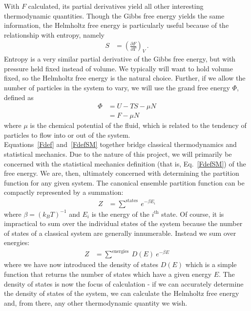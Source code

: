 \documentclass[12pt]{article}
\begin{document}
With $F$ calculated, its partial derivatives yield all other interesting thermodynamic quantities. Though the Gibbs free energy yields the same information, the Helmholtz free energy is particularly useful because of the relationship with entropy, namely
\begin{align}
    S &= \left(\frac{\partial F}{\partial T}\right)_{V}\, .
\end{align}
Entropy is a very similar partial derivative of the Gibbs free energy, but with pressure held fixed instead of volume. We typically will want to hold volume fixed, so the Helmholtz free energy is the natural choice. Further, if we allow the number of particles in the system to vary, we will use the grand free energy $\Phi$, defined as
\begin{align}
    \Phi &= U-TS-\mu N\\
    &= F - \mu N
    \label{Phidef}
\end{align}
where $\mu$ is the chemical potential of the fluid, which is related to the tendency of particles to flow into or out of the system.\\

Equations~\ref{Fdef} and~\ref{FdefSM} together bridge classical thermodynamics and statistical mechanics. Due to the nature of this project, we will primarily be concerned with the statistical mechanics definition (that is, Eq.~\ref{FdefSM}) of the free energy. We are, then, ultimately concerned with determining the partition function for any given system. The canonical ensemble partition function can be compactly represented by a summation:
\begin{align}
    Z &= \sum^{\text{states}}~e^{-\beta E_i}
\end{align}
where $\beta = (k_B T)^{-1}$ and $E_i$ is the energy of the $i^{\text{th}}$ state. Of course, it is impractical to sum over the individual states of the system because the number of states of a classical system are generally innumerable. Instead we sum over energies:
\begin{align}
    Z &= \sum^{\text{energies}}~D(E)~e^{-\beta E}
\end{align}
where we have now introduced the density of states $D(E)$ which is a simple function that returns the number of states which have a given energy $E$. The density of states is now the focus of calculation - if we can accurately determine the density of states of the system, we can calculate the Helmholtz free energy and, from there, any other thermodynamic quantity we wish. \\  
\end{document}
